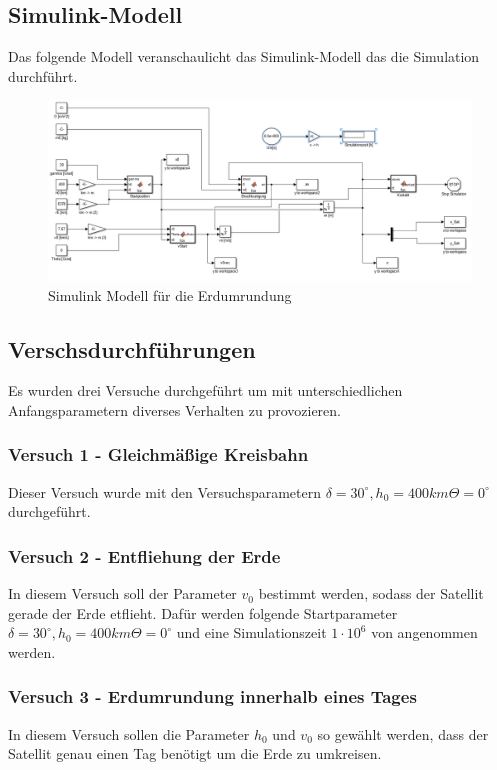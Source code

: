 \documentclass[]{scrartcl}
\begin{document}
\subsection{Simulink-Modell}

Das folgende Modell veranschaulicht das Simulink-Modell das die Simulation durchführt.

\begin{figure}[H]
\centering
\includegraphics[width=1\linewidth]{./Weltraum_1}
\caption{Simulink Modell für die Erdumrundung}
\label{fig:1_BezeichnerDiagramm}
\end{figure}

\subsection{Verschsdurchführungen}
Es wurden drei Versuche durchgeführt um mit unterschiedlichen Anfangsparametern diverses Verhalten zu provozieren.

\subsubsection{Versuch 1 - Gleichmäßige Kreisbahn}

Dieser Versuch wurde mit den Versuchsparametern $\delta = 30^\circ, h_0 = 400km \Theta = 0^\circ $ durchgeführt.


\subsubsection{Versuch 2 - Entfliehung der Erde}
In diesem Versuch soll der Parameter $v_0$ bestimmt werden, sodass der Satellit gerade der Erde etflieht. Dafür werden folgende Startparameter 
 $\delta = 30^\circ, h_0 = 400km \Theta = 0^\circ $ und eine Simulationszeit $1 \cdot 10^6$ von angenommen werden.


\subsubsection{Versuch 3 - Erdumrundung innerhalb eines Tages}
In diesem Versuch sollen die Parameter $h_0$ und $v_0$ so gewählt werden, dass der Satellit genau einen Tag benötigt um die Erde zu umkreisen.
\end{document}
